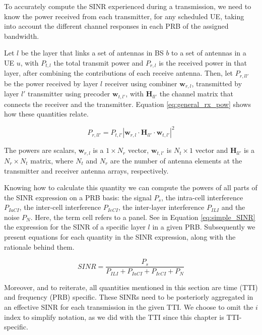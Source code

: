 To accurately compute the SINR experienced during a transmission, we need to 
know the power received from each transmitter, for any scheduled \acs{UE}, taking into account the different channel responses in each \acs{PRB} of the assigned bandwidth.

Let $l$ be the layer that links a set of antennas in BS $b$ to a set of antennas in a UE $u$, with $P_{t, l}$ the total transmit power and $P_{r, l}$ is the received power in that layer, after combining the contributions of each receive antenna. Then, let $P_{r, ll'}$ be the power received by layer $l$ receiver using combiner $\bm{w}_{r, l}$, transmitted by layer $l'$ transmitter using precoder $\bm{w}_{t, l'}$, with $\bm{H}_{ll'}$ the channel matrix that connects the receiver and the transmitter. Equation \eqref{eq:general_rx_pow} shows how these quantities relate.

\begin{equation} \label{eq:general_rx_pow}
    P_{r, ll'} = P_{t, l'} \left| \bm{w}_{r, l} \cdot \bm{H}_{ll'} \cdot \bm{w}_{t, l'} \right|^2        
\end{equation}

The powers are scalars, $\bm{w}_{r, l}$ is a $1 \times N_r$ vector, $\bm{w}_{t, l'}$ is $N_t \times 1$ vector and $\bm{H}_{ll'}$ is a $N_r \times N_t$ matrix, where $N_t$ and $N_r$ are the number of antenna elements at the transmitter and receiver antenna arrays, respectively.

Knowing how to calculate this quantity we can compute the powers of all parts of the SINR expression on a PRB basis: the signal $P_s$, the intra-cell interference $P_{IaCI}$, the inter-cell interference $P_{IeCI}$, the inter-layer interference $P_{ILI}$ and the noise $P_N$. Here, the term cell refers to a panel. See in Equation \eqref{eq:simple_SINR} the expression for the SINR of a specific layer $l$ in a given PRB. Subsequently we present equations for each quantity in the SINR expression, along with the rationale behind them. 


\begin{equation} \label{eq:simple_SINR}
    SINR = \frac{P_s}{P_{ILI} + P_{IaCI} + P_{IeCI} + P_N}
\end{equation}

Moreover, and to reiterate, all quantities mentioned in this section are time (TTI) and frequency (PRB) specific. These SINRs need to be posteriorly aggregated in an effective SINR for each transmission in the given TTI. We choose to omit the $i$ index to simplify notation, as we did with the TTI since this chapter is TTI-specific.

